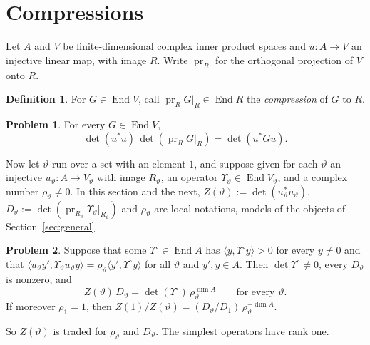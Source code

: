 \documentclass[reqno]{amsart}
\theoremstyle{definition}
\newtheorem{problem}{Problem}[section]
\newtheorem{definition}{Definition}[section]
\theoremstyle{plain}
\theoremstyle{remark}
\newcommand{\pr}{\operatorname{pr}}
\newcommand{\End}{\operatorname{End}}
\begin{document}
\section{Compressions}\label{sec:compress}

Let \(A\) and \(V\) be finite-dimensional complex inner product spaces and \(u \colon A \to V\) an injective linear map, with image \(R\).  Write \(\pr_R\) for the orthogonal projection of \(V\) onto \(R\).

\begin{definition}\label{def:compression}
For \(G \in \End V\), call \(\pr_R G|_R \in \End R\) the \emph{compression} of \(G\) to \(R\).
\end{definition}

\begin{problem}\label{pr:compression}
For every \(G \in \End V\),
\[
  \det(u^*u)\,\det(\pr_R G|_R) = \det(u^* G u) .
\]
\end{problem}

Now let \(\vartheta\) run over a set with an element \(1\), and suppose given for each \(\vartheta\) an injective \(u_\vartheta \colon A \to V_\vartheta\) with image \(R_\vartheta\), an operator \(\Upsilon_\vartheta \in \End V_\vartheta\), and a complex number \(\rho_\vartheta \ne 0\).  In this section and the next, \(Z(\vartheta) := \det(u_\vartheta^* u_\vartheta)\), \(D_\vartheta := \det(\pr_{R_\vartheta} \Upsilon_\vartheta|_{R_\vartheta})\) and \(\rho_\vartheta\) are local notations, models of the objects of Section~\ref{sec:general}.

\begin{problem}\label{pr:comparison}
Suppose that some \(\Upsilon^\circ \in \End A\) has \(\langle y, \Upsilon^\circ y\rangle > 0\) for every \(y \ne 0\) and that \(\langle u_\vartheta y', \Upsilon_\vartheta u_\vartheta y\rangle = \rho_\vartheta \langle y', \Upsilon^\circ y\rangle\) for all \(\vartheta\) and \(y', y \in A\).  Then \(\det \Upsilon^\circ \ne 0\), every \(D_\vartheta\) is nonzero, and
\[
  Z(\vartheta)\,D_\vartheta = \det(\Upsilon^\circ)\, \rho_\vartheta^{\dim A}
  \qquad\text{for every } \vartheta .
\]
If moreover \(\rho_1 = 1\), then \(Z(1)/Z(\vartheta) = (D_\vartheta/D_1)\,\rho_\vartheta^{-\dim A}\).
\end{problem}

So \(Z(\vartheta)\) is traded for \(\rho_\vartheta\) and \(D_\vartheta\).  The simplest operators have rank one.
\end{document}
